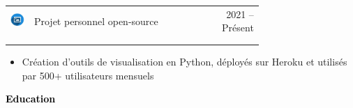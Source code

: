 \documentclass{article}
\begin{document}
\begin{paracol}{2}
\colorbox{maincolor}{%
  \begin{minipage}{\linewidth}
    \begin{tabular}{@{}lp{0.72\linewidth}r}
      \begin{minipage}{0.05\linewidth}
        \includegraphics[width=\linewidth]{picon.png}
      \end{minipage} & 
      Projet personnel open-source &  
      {\footnotesize 2021 -- Présent } \\[-10pt]
      & {\color{sidetext}{Développeur Data}} & \\
      & {\small } & \\
    \end{tabular}
\begin{itemize}
    \item Création d’outils de visualisation en Python, déployés sur Heroku et utilisés par 500+ utilisateurs mensuels
\end{itemize}
  \end{minipage}%
}


\vspace{1cm}

\textcolor{black}{\Large \textbf{Education}} \\



\end{paracol}
\end{document}
